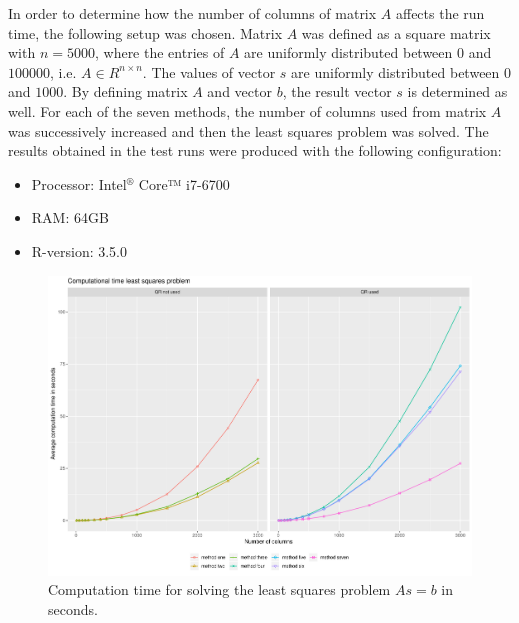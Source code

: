 In order to determine how the number of columns of matrix $A$ affects the run time, the following setup was chosen. Matrix $A$ was defined as a square matrix with $n = 5000$, where the entries of $A$ are uniformly distributed between $0$ and $100000$, i.e. $A \in R^{n \times n}$. The values of vector $s$ are uniformly distributed between $0$ and $1000$. By defining matrix $A$ and vector $b$, the result vector $s$ is determined as well. For each of the seven methods, the number of columns used from matrix $A$ was successively increased and then the least squares problem was solved. The results obtained in the test runs were produced with the following configuration: 
\begin{itemize}
	\item Processor: Intel$^{®}$ Core™ i7-6700
	\item RAM: 64GB
	\item \textsf{R}-version: 3.5.0
\end{itemize}
\begin{figure}
	\centering
	\includegraphics[width=\textwidth]{figures/chapter_NNLS/computation_time}
	\caption{Computation time for solving the least squares problem $As = b$ in seconds.}
	\label{fig:comp_time}
\end{figure}
